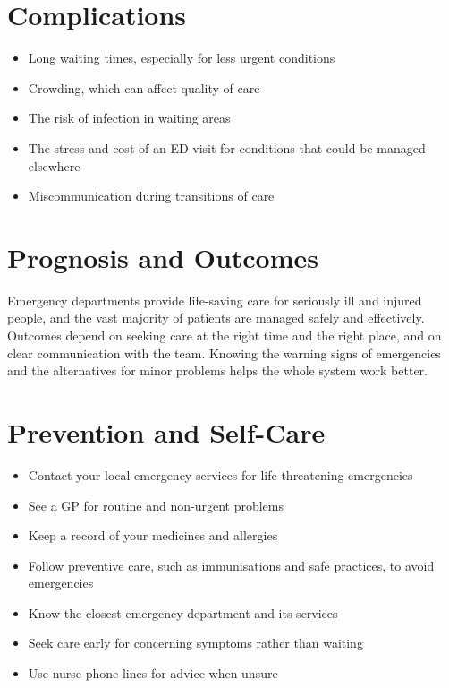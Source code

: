 \section*{Complications}
\begin{itemize}
    \item Long waiting times, especially for less urgent conditions
    \item Crowding, which can affect quality of care
    \item The risk of infection in waiting areas
    \item The stress and cost of an ED visit for conditions that could be managed elsewhere
    \item Miscommunication during transitions of care
\end{itemize}

\section*{Prognosis and Outcomes}
Emergency departments provide life-saving care for seriously ill and injured people, and the vast majority of patients are managed safely and effectively. Outcomes depend on seeking care at the right time and the right place, and on clear communication with the team. Knowing the warning signs of emergencies and the alternatives for minor problems helps the whole system work better.

\section*{Prevention and Self-Care}
\begin{itemize}
    \item Contact your local emergency services for life-threatening emergencies
    \item See a GP for routine and non-urgent problems
    \item Keep a record of your medicines and allergies
    \item Follow preventive care, such as immunisations and safe practices, to avoid emergencies
    \item Know the closest emergency department and its services
    \item Seek care early for concerning symptoms rather than waiting
    \item Use nurse phone lines for advice when unsure
\end{itemize}


